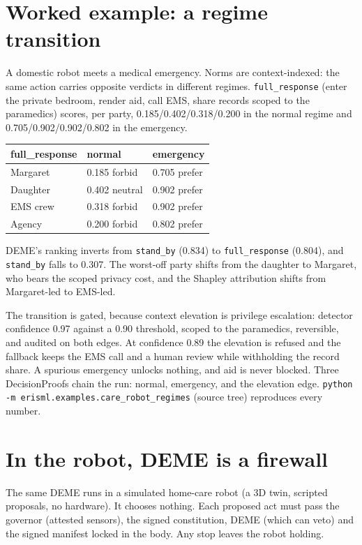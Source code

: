 \documentclass[11pt,twocolumn]{extarticle}
\begin{document}
\section{Worked example: a regime transition}
A domestic robot meets a medical emergency. Norms are context-indexed: the same action
carries opposite verdicts in different regimes. \texttt{full\_response} (enter the private
bedroom, render aid, call EMS, share records scoped to the paramedics) scores, per party,
0.185/0.402/0.318/0.200 in the normal regime and 0.705/0.902/0.902/0.802 in the emergency.

\begin{center}\small
\begin{tabular}{@{}lll@{}}
\textbf{full\_response} & \textbf{normal} & \textbf{emergency}\\\hline
Margaret & 0.185 forbid & 0.705 prefer\\
Daughter & 0.402 neutral & 0.902 prefer\\
EMS crew & 0.318 forbid & 0.902 prefer\\
Agency & 0.200 forbid & 0.802 prefer\\
\end{tabular}
\end{center}

DEME's ranking inverts from \texttt{stand\_by} (0.834) to \texttt{full\_response} (0.804),
and \texttt{stand\_by} falls to 0.307. The worst-off party shifts from the daughter to
Margaret, who bears the scoped privacy cost, and the Shapley attribution shifts from
Margaret-led to EMS-led.

The transition is gated, because context elevation is privilege escalation: detector
confidence 0.97 against a 0.90 threshold, scoped to the paramedics, reversible, and
audited on both edges. At confidence 0.89 the elevation is refused and the fallback keeps
the EMS call and a human review while withholding the record share. A spurious emergency
unlocks nothing, and aid is never blocked. Three DecisionProofs chain the run: normal,
emergency, and the elevation edge.
\texttt{python -m erisml.examples.care\_robot\_regimes} (source tree) reproduces every
number.

\section{In the robot, DEME is a firewall}
The same DEME runs in a simulated home-care robot (a 3D twin, scripted proposals, no
hardware). It chooses nothing. Each proposed act must pass the governor (attested
sensors), the signed constitution, DEME (which can veto) and the signed manifest locked
in the body. Any stop leaves the robot holding.
\end{document}
